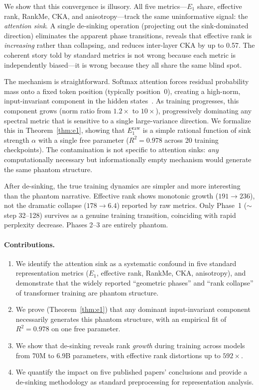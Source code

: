 \documentclass[11pt]{article}
\begin{document}
We show that this convergence is illusory. All five metrics---$E_1$ share, effective rank, RankMe, CKA, and anisotropy---track the same uninformative signal: the \emph{attention sink}. A single de-sinking operation (projecting out the sink-dominated direction) eliminates the apparent phase transitions, reveals that effective rank is \emph{increasing} rather than collapsing, and reduces inter-layer CKA by up to 0.57. The coherent story told by standard metrics is not wrong because each metric is independently biased---it is wrong because they all share the same blind spot.

The mechanism is straightforward. Softmax attention forces residual probability mass onto a fixed token position (typically position~0), creating a high-norm, input-invariant component in the hidden states~\citep{xiao2023efficient}. As training progresses, this component grows (norm ratio from $1.2\times$ to $10\times$), progressively dominating any spectral metric that is sensitive to a single large-variance direction. We formalize this in Theorem~\ref{thm:e1}, showing that $E_1^{\text{raw}}$ is a simple rational function of sink strength $\alpha$ with a single free parameter ($R^2 = 0.978$ across 20 training checkpoints). The contamination is not specific to attention sinks: \emph{any} computationally necessary but informationally empty mechanism would generate the same phantom structure.

After de-sinking, the true training dynamics are simpler and more interesting than the phantom narrative. Effective rank shows monotonic growth ($191 \to 236$), not the dramatic collapse ($178 \to 6.4$) reported by raw metrics. Only Phase~1 (${\sim}$step 32--128) survives as a genuine training transition, coinciding with rapid perplexity decrease. Phases 2--3 are entirely phantom.

\paragraph{Contributions.}
\begin{enumerate}[leftmargin=1.5em,itemsep=1pt,topsep=2pt]
    \item We identify the attention sink as a systematic confound in five standard representation metrics ($E_1$, effective rank, RankMe, CKA, anisotropy), and demonstrate that the widely reported ``geometric phases'' and ``rank collapse'' of transformer training are phantom structure.
    \item We prove (Theorem~\ref{thm:e1}) that any dominant input-invariant component necessarily generates this phantom structure, with an empirical fit of $R^2 = 0.978$ on one free parameter.
    \item We show that de-sinking reveals rank \emph{growth} during training across models from 70M to 6.9B parameters, with effective rank distortions up to $592\times$.
    \item We quantify the impact on five published papers' conclusions and provide a de-sinking methodology as standard preprocessing for representation analysis.
\end{enumerate}
\end{document}
